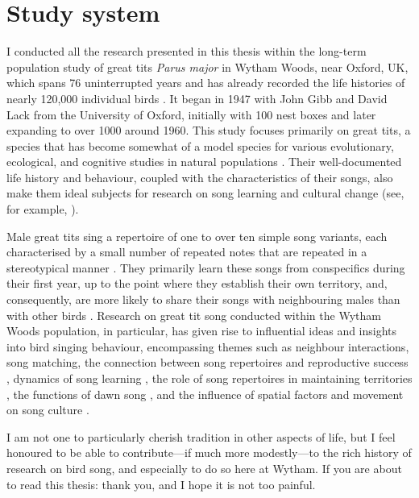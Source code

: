 \section{Study system}
I conducted all the research presented in this thesis within the long-term population study of great tits \textit{Parus major} in Wytham Woods, near Oxford, UK, which spans 76 uninterrupted years and has already recorded the life histories of nearly 120,000 individual birds \autocite{sheldon2022}. It began in 1947 with John Gibb and David Lack from the University of Oxford, initially with 100 nest boxes and later expanding to over 1000 around 1960. This study focuses primarily on great tits, a species that has become somewhat of a model species for various evolutionary, ecological, and cognitive studies in natural populations \autocite{aplin2017, Boyce1987, charmantier2008, cole2012,firth2018,Firth2016a,spurgin2019}. Their well-documented life history and behaviour, coupled with the characteristics of their songs, also make them ideal subjects for research on song learning and cultural change (see, for example, \cite{lambrechts1990, lind1996, rivera-gutierrez2010a, rivera-gutierrez2010, rivera-gutierrez2011, slagsvold1994, Ritschard2012}). 

Male great tits sing a repertoire of one to over ten simple song variants, each characterised by a small number of repeated notes that are repeated in a stereotypical manner \autocite{krebs1978,rivera-gutierrez2010a}. They primarily learn these songs from conspecifics during their first year, up to the point where they establish their own territory, and, consequently, are more likely to share their songs with neighbouring males than with other birds \autocite{mcgregor1982,mcgregor1989}. Research on great tit song conducted within the Wytham Woods population, in particular, has given rise to influential ideas and insights into bird singing behaviour, encompassing themes such as neighbour interactions, song matching, the connection between song repertoires and reproductive success \parencite{mcgregor1981, mcgregor1983, mcgregor1989}, dynamics of song learning \parencite{mcgregor1989, mcgregor1982b}, the role of song repertoires in maintaining territories \parencite{krebs1976, krebs1978}, the functions of dawn song \parencite{kacelnik1983, mace1987}, and the influence of spatial factors and movement on song culture \parencite{fayet2014}. 

I am not one to particularly cherish tradition in other aspects of life, but I feel honoured to be able to contribute---if much more modestly---to the rich history of research on bird song, and especially to do so here at Wytham. If you are about to read this thesis: thank you, and I hope it is not too painful.

